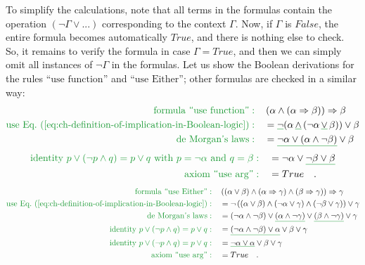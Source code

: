 To simplify the calculations, note that all terms in the formulas
contain the operation $\left(\neg\Gamma\vee...\right)$ corresponding
to the context $\Gamma$. Now, if $\Gamma$ is $False$, the entire
formula becomes automatically $True$, and there is nothing else to
check. So, it remains to verify the formula in case $\Gamma=True$,
and then we can simply omit all instances of $\neg\Gamma$ in the
formulas. Let us show the Boolean derivations for the rules \textsf{``}$\text{use function}$\textsf{''}
and \textsf{``}$\text{use Either}$\textsf{''}; other formulas are checked in a similar
way:
\begin{align*}
{\color{greenunder}\text{formula \textsf{``}use function\textsf{''}}:}\quad & \left(\alpha\wedge\left(\alpha\Rightarrow\beta\right)\right)\Rightarrow\beta\\
{\color{greenunder}\text{use Eq.~(\ref{eq:ch-definition-of-implication-in-Boolean-logic})}:}\quad & =\gunderline{\neg}(\alpha\,\gunderline{\wedge}\,(\neg\alpha\,\gunderline{\vee}\,\beta))\vee\beta\\
{\color{greenunder}\text{de Morgan\textsf{'}s laws}:}\quad & =\gunderline{\neg\alpha\vee(\alpha\wedge\neg\beta)}\vee\beta
\end{align*}
\begin{align*}
{\color{greenunder}\text{identity }p\vee(\neg p\wedge q)=p\vee q\text{ with }p=\neg\alpha\text{ and }q=\beta:}\quad & =\neg\alpha\vee\gunderline{\neg\beta\vee\beta}\\
{\color{greenunder}\text{axiom \textsf{``}use arg\textsf{''}}:}\quad & =True\quad.
\end{align*}
\begin{align*}
{\color{greenunder}\text{formula \textsf{``}use Either\textsf{''}}:}\quad & \left(\left(\alpha\vee\beta\right)\wedge\left(\alpha\Rightarrow\gamma\right)\wedge\left(\beta\Rightarrow\gamma\right)\right)\Rightarrow\gamma\\
{\color{greenunder}\text{use Eq.~(\ref{eq:ch-definition-of-implication-in-Boolean-logic})}:}\quad & =\neg\left(\left(\alpha\vee\beta\right)\wedge\left(\neg\alpha\vee\gamma\right)\wedge\left(\neg\beta\vee\gamma\right)\right)\vee\gamma\\
{\color{greenunder}\text{de Morgan\textsf{'}s laws}:}\quad & =\left(\neg\alpha\wedge\neg\beta\right)\vee\gunderline{\left(\alpha\wedge\neg\gamma\right)}\vee\gunderline{\left(\beta\wedge\neg\gamma\right)}\vee\gamma\\
{\color{greenunder}\text{identity }p\vee(\neg p\wedge q)=p\vee q:}\quad & =\gunderline{\left(\neg\alpha\wedge\neg\beta\right)\vee\alpha}\vee\beta\vee\gamma\\
{\color{greenunder}\text{identity }p\vee(\neg p\wedge q)=p\vee q:}\quad & =\gunderline{\neg\alpha\vee\alpha}\vee\beta\vee\gamma\\
{\color{greenunder}\text{axiom \textsf{``}use arg\textsf{''}}:}\quad & =True\quad.
\end{align*}
